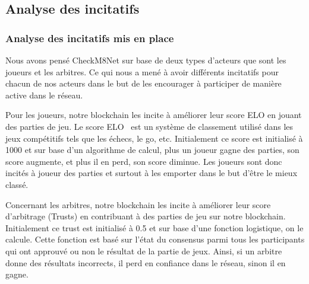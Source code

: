 \documentclass[journal, a4paper]{IEEEtran}
\begin{document}
	\subsection{Analyse des incitatifs}\label{subsec:analyse-des-incitatifs}
		\begin{center}
			\subsubsection*{\textbf{Analyse des incitatifs mis en place}}\label{subsubsec:analyse-des-incitatifs-mis-en-place}
		\end{center}
			Nous avons pensé CheckM8Net sur base de deux types d'acteurs que sont les joueurs et les arbitres.
			Ce qui nous a mené à avoir différents incitatifs pour chacun de nos acteurs dans le but de les encourager
			à participer de manière active dans le réseau.

			Pour les joueurs, notre blockchain les incite à améliorer leur score ELO en jouant des parties de jeu.
			Le score ELO~\cite{ELO} est un système de classement utilisé dans les jeux compétitifs tels que les échecs, le go, etc.
			Initialement ce score est initialisé à 1000 et sur base d'un algorithme de calcul, plus un joueur gagne des parties,
			son score augmente, et plus il en perd, son score diminue.
			Les joueurs sont donc incités à joueur des parties et surtout à les emporter dans le but d'être le mieux classé.

			Concernant les arbitres, notre blockchain les incite à améliorer leur score d'arbitrage (Trusts) en contribuant
			à des parties de jeu sur notre blockchain.
			Initialement ce trust est initialisé à 0.5 et sur base d'une fonction logistique, on le calcule.
			Cette fonction est basé sur l'état du consensus parmi tous les participants qui ont approuvé ou non
			le résultat de la partie de jeux.
			Ainsi, si un arbitre donne des résultats incorrects, il perd en confiance dans le réseau, sinon il en gagne.
\end{document}
